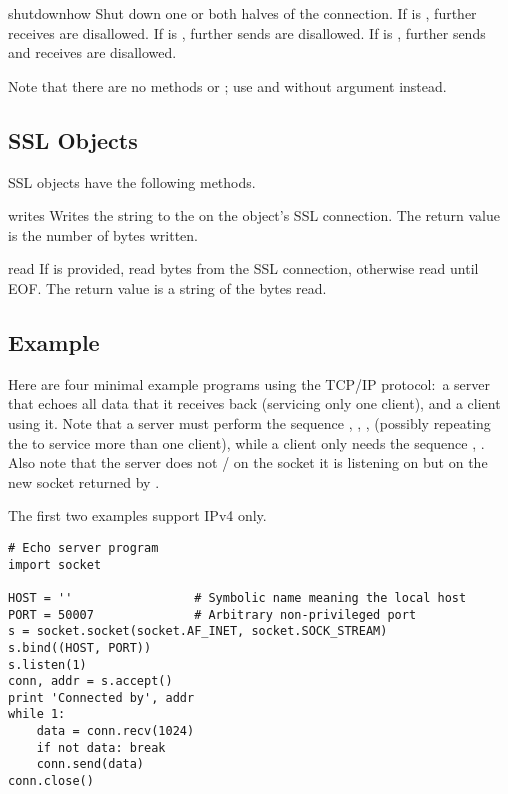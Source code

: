 \begin{methoddesc}[socket]{shutdown}{how}
Shut down one or both halves of the connection.  If  is
, further receives are disallowed.  If  is ,
further sends are disallowed.  If  is , further sends
and receives are disallowed.
\end{methoddesc}

Note that there are no methods  or ;
use  and  without  argument
instead.


\subsection{SSL Objects \label{ssl-objects}}

SSL objects have the following methods.

\begin{methoddesc}{write}{s}
Writes the string  to the on the object's SSL connection.
The return value is the number of bytes written.
\end{methoddesc}

\begin{methoddesc}{read}{}
If  is provided, read  bytes from the SSL connection, otherwise
read until EOF. The return value is a string of the bytes read.
\end{methoddesc}

\subsection{Example \label{socket-example}}

Here are four minimal example programs using the TCP/IP protocol:\ a
server that echoes all data that it receives back (servicing only one
client), and a client using it.  Note that a server must perform the
sequence , , ,
 (possibly repeating the  to service
more than one client), while a client only needs the sequence
, .  Also note that the server
does not / on the 
socket it is listening on but on the new socket returned by
.

The first two examples support IPv4 only.

\begin{verbatim}
# Echo server program
import socket

HOST = ''                 # Symbolic name meaning the local host
PORT = 50007              # Arbitrary non-privileged port
s = socket.socket(socket.AF_INET, socket.SOCK_STREAM)
s.bind((HOST, PORT))
s.listen(1)
conn, addr = s.accept()
print 'Connected by', addr
while 1:
    data = conn.recv(1024)
    if not data: break
    conn.send(data)
conn.close()
\end{verbatim}


